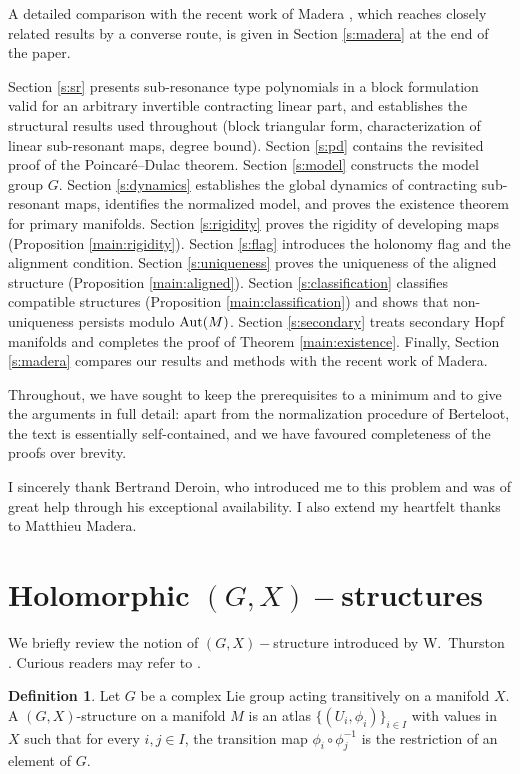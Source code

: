 \documentclass[english,11pt]{amsart}
\theoremstyle{definition}
\newtheorem{definition}[theorem]{Definition}
\theoremstyle{remark}
\numberwithin{equation}{section}
\newcommand{\Aut}{\mathop{\rm Aut}}
\begin{document}
A detailed comparison with the recent work of Madera \cite{Madera}, which reaches closely related results by a converse route, is given in Section \ref{s:madera} at the end of the paper.

 Section \ref{s:sr} presents sub-resonance type polynomials in a block formulation valid for an arbitrary invertible contracting linear part, and establishes the structural results used throughout (block triangular form, characterization of linear sub-resonant maps, degree bound). Section \ref{s:pd} contains the revisited proof of the Poincar\'e--Dulac theorem. Section \ref{s:model} constructs the model group $G$. Section \ref{s:dynamics} establishes the global dynamics of contracting sub-resonant maps, identifies the normalized model, and proves the existence theorem for primary manifolds. Section \ref{s:rigidity} proves the rigidity of developing maps (Proposition \ref{main:rigidity}). Section \ref{s:flag} introduces the holonomy flag and the alignment condition. Section \ref{s:uniqueness} proves the uniqueness of the aligned structure (Proposition \ref{main:aligned}). Section \ref{s:classification} classifies compatible structures (Proposition \ref{main:classification}) and shows that non-uniqueness persists modulo $\Aut(M)$. Section \ref{s:secondary} treats secondary Hopf manifolds and completes the proof of Theorem \ref{main:existence}. Finally, Section \ref{s:madera} compares our results and methods with the recent work of Madera.

Throughout, we have sought to keep the prerequisites to a minimum and to give the arguments in full detail: apart from the normalization procedure of Berteloot, the text is essentially self-contained, and we have favoured completeness of the proofs over brevity.

I sincerely thank Bertrand Deroin, who introduced me to this problem and was of great help through his exceptional availability. I also extend my heartfelt thanks to Matthieu Madera.

\section{Holomorphic $(G,X)-$structures}\label{s:gx}

We briefly review the notion of $(G,X)-$structure introduced by W.~Thurston \cite{Thurston}. Curious readers may refer to \cite{Goldman}.


\begin{definition}\label{d:gx}
Let $G$ be a complex Lie group acting transitively on a manifold $X$. A $(G,X)$-structure on a manifold $M$ is an atlas $\{(U_i, \phi_i)\}_{i \in I}$ with values in $X$ such that for every $i, j \in I$, the transition map $\phi_i \circ \phi_j^{-1}$ is the restriction of an element of $G$.
\end{definition}
\end{document}
